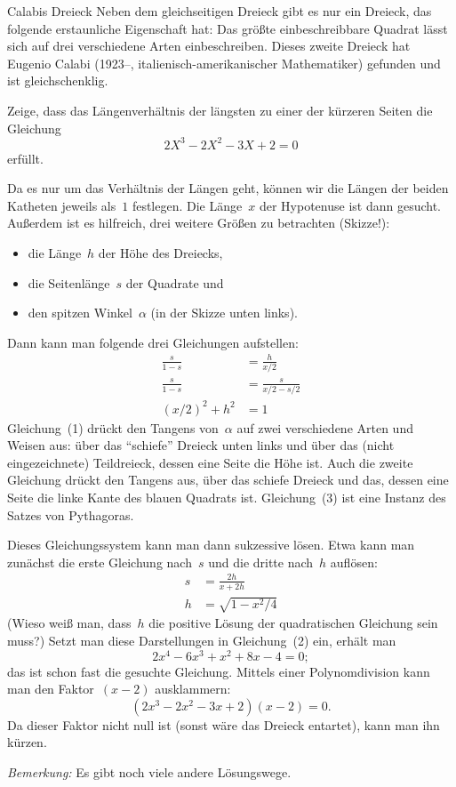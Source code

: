 \documentclass{algblatt}
\begin{document}
\begin{aufgabe}{Calabis Dreieck}
Neben dem gleichseitigen Dreieck gibt es nur ein Dreieck, das folgende erstaunliche
Eigenschaft hat: Das größte 
einbeschreibbare Quadrat lässt sich auf drei verschiedene Arten einbeschreiben.
Dieses zweite Dreieck hat Eugenio Calabi (1923--, italienisch-amerikanischer
Mathematiker) gefunden und ist gleichschenklig.

Zeige, dass das Längenverhältnis der längsten zu einer der kürzeren Seiten die
Gleichung
\[ 2 X^3 - 2 X^2 - 3 X + 2 = 0 \]
erfüllt. \\[1em]

\begin{center}
  \scalebox{0.5}{}
\end{center}

\begin{loesung}\addtolength{\jot}{0.3em}%
Da es nur um das Verhältnis der Längen geht, können wir die Längen der
beiden Katheten jeweils als~$1$ festlegen. Die Länge~$x$ der Hypotenuse ist
dann gesucht. Außerdem ist es hilfreich, drei weitere Größen zu betrachten
(Skizze!):
\begin{itemize}
\item die Länge~$h$ der Höhe des Dreiecks,
\item die Seitenlänge~$s$ der Quadrate und
\item den spitzen Winkel~$\alpha$ (in der Skizze unten links).
\end{itemize}
Dann kann man folgende drei Gleichungen aufstellen:
\begin{align}
  \frac{s}{1 - s} &= \frac{h}{x/2} \\
  \frac{s}{1 - s} &= \frac{s}{x/2 - s/2} \\
  (x/2)^2 + h^2 &= 1
\end{align}
Gleichung~(1) drückt den Tangens von~$\alpha$ auf zwei verschiedene Arten und
Weisen aus: über das "`schiefe"' Dreieck unten links und über das (nicht
eingezeichnete) Teildreieck, dessen eine Seite die Höhe ist. Auch die zweite
Gleichung drückt den Tangens aus, über das schiefe Dreieck und das, dessen eine
Seite die linke Kante des blauen Quadrats ist. Gleichung~(3) ist eine Instanz
des Satzes von Pythagoras.

Dieses Gleichungssystem kann man dann sukzessive lösen. Etwa kann man zunächst
die erste Gleichung nach~$s$ und die dritte nach~$h$ auflösen:
\begin{align*}
  s &= \frac{2h}{x + 2h} \\
  h &= \sqrt{1 - x^2/4}
\end{align*}
(Wieso weiß man, dass~$h$ die positive Lösung der quadratischen Gleichung sein
muss?) Setzt man diese Darstellungen in Gleichung~(2) ein, erhält man
\[ 2x^4 - 6x^3 + x^2 + 8x - 4 = 0; \]
das ist schon fast die gesuchte Gleichung. Mittels einer Polynomdivision kann
man den Faktor~$(x-2)$ ausklammern:
\[ (2x^3 - 2x^2 - 3x + 2) (x-2) = 0. \]
Da dieser Faktor nicht null ist (sonst wäre das Dreieck entartet), kann man ihn
kürzen.

\emph{Bemerkung:} Es gibt noch viele andere Lösungswege.
\end{loesung}
\end{aufgabe}
\end{document}
